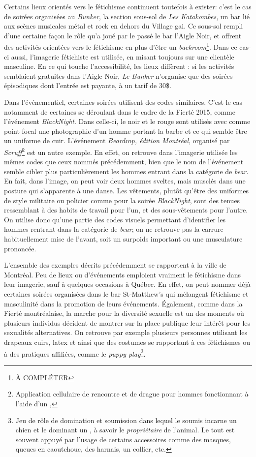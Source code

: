 Certains lieux orientés vers le fétichisme continuent toutefois à exister: c'est le cas de soirées organisées au \emph{Bunker}, la section sous-sol de \emph{Les Katakombes}, un bar lié aux scènes musicales métal et rock en dehors du Village gai.
Ce sous-sol rempli d'une certaine façon le rôle qu'a joué par le passé le bar l'Aigle Noir, et offrent des activités orientées vers le fétichisme en plus d'être un \emph{backroom}\footnote{À COMPLÉTER}.
Dans ce cas-ci aussi, l'imagerie fétichiste est utilisée, en misant toujours sur une clientèle masculine.
En ce qui touche l'accessibilité, les lieux diffèrent : si les activités semblaient gratuites dans l'Aigle Noir, \emph{Le Bunker} n'organise que des soirées épisodiques dont l'entrée est payante, à un tarif de 30\$.

Dans l'événementiel, certaines soirées utilisent des codes similaires.
C'est le cas notamment de certaines se déroulant dans le cadre de la Fierté 2015, comme l'événement  \emph{BlackNight}.
Dans celle-ci, le noir et le rouge sont utilisés avec comme point focal une photographie d'un homme portant la barbe et ce qui semble être un uniforme de cuir.
L'événement \emph{Beardrop, édition Montréal}, organisé par \emph{Scruff}\footnote{Application cellulaire de rencontre et de drague pour hommes fonctionnant à l'aide d'un \gps{} ,} est un autre exemple.
En effet, on retrouve dans l'imagerie utilisée les mêmes codes que ceux nommés précédemment, bien que le nom de l'événement semble cibler plus particulièrement les hommes entrant dans la catégorie de \emph{bear}.
En fait, dans l'image, on peut voir deux hommes sveltes, mais musclés dans une posture qui s'apparente à une danse.
Les vêtements, plutôt qu'être des uniformes de style militaire ou policier comme pour la soirée \emph{BlackNight}, sont des tenues ressemblant à des habits de travail pour l'un, et des sous-vêtements pour l'autre.
On utilise donc qu'une partie des codes visuels permettant d'identifier les hommes rentrant dans la catégorie de \emph{bear}; on ne retrouve pas la carrure habituellement mise de l'avant, soit un surpoids important ou une musculature prononcée.

L'ensemble des exemples décrits précédemment se rapportent à la ville de Montréal.
Peu de lieux ou d'événements emploient vraiment le fétichisme dans leur imagerie, sauf à quelques occasions à Québec.
En effet, on peut nommer déjà certaines soirées organisées dans le bar St-Matthew's qui mélangent fétichisme et masculinité dans la promotion de leurs événements.
Également, comme dans la Fierté montréalaise, la marche pour la diversité sexuelle est un des moments où plusieurs individus décident de montrer sur la place publique leur intérêt pour les sexualités alternatives.
On retrouve par exemple plusieurs personnes utilisant les drapeaux cuirs, latex et \bdsm{} ainsi que des costumes se rapportant à ces fétichismes ou à des pratiques affiliées, comme le \emph{puppy play}\footnote{Jeu de rôle de domination et soumission dans lequel le soumis incarne un chien  et le dominant un , à savoir le \emph{propriétaire} de l'animal.
Le tout est souvent appuyé par l'usage de certains accessoires comme des masques, queues en caoutchouc, des harnais, un collier, etc.}.

